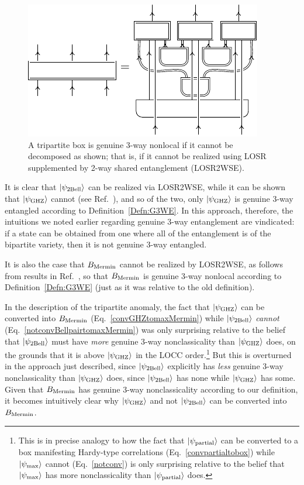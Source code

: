\documentclass[prx,11pt,letterpaper,twocolumn,accepted=2023-11-27]{quantumarticle}
\newcommand{\ket}[1]{\left| #1 \right>}
\theoremstyle{plain}
\theoremstyle{definition}
\begin{document}
\begin{figure}[htb!]
\centering
    \includegraphics[scale=1]{fig_non_locality.pdf}
    \caption{
           A tripartite box is genuine 3-way nonlocal if it cannot be decomposed as shown; that is, if it cannot be realized using LOSR supplemented by 2-way shared entanglement (LOSR2WSE).  }
    \label{non_locality}
\end{figure}


 It is clear that $\ket{\psi_{\rm 2Bell}}$ can be realized via LOSR2WSE,
  while it can be shown that $\ket{\psi_{\rm GHZ}}$ cannot (see  Ref.~\cite{navascues2020genuine}), and so of the two, only $\ket{\psi_{\rm GHZ}}$ is genuine 3-way entangled according to Definition~\ref{Defn:G3WE}.
   In this approach, therefore, the intuitions we noted earlier regarding genuine 3-way entanglement are vindicated: if a state can be obtained from one where all of the entanglement is of the bipartite variety, then it is not genuine 3-way entangled.  

 It is also the case that 
 $B_{\rm Mermin}$ cannot be realized by LOSR2WSE, as follows from results
 in Ref.~\cite{wolfe2021infl}, so that  $B_{\rm Mermin}$ is genuine 3-way nonlocal according to Definition~\ref{Defn:G3WE}
   (just as it was relative to the old definition).
 
In the description of the tripartite anomaly, the fact that $\ket{\psi_{\rm GHZ}}$ can be converted into $B_{\rm Mermin}$ (Eq.~\eqref{convGHZtomaxMermin})  while $\ket{\psi_{\rm 2Bell}}$ {\em cannot} (Eq.~\eqref{notconvBellpairtomaxMermin})
 was only surprising relative to the belief that $\ket{\psi_{\rm 2Bell}}$ must have {\em more} genuine 3-way nonclassicality than $\ket{\psi_{\rm GHZ}}$ does, on the grounds that it is above $\ket{\psi_{\rm GHZ}}$ in the LOCC order.\footnote{This is in precise analogy to how the fact that $\ket{\psi_{\rm partial}}$ can be converted to a box manifesting Hardy-type correlations (Eq.~\eqref{convpartialtobox}) while $\ket{\psi_{\rm max}}$ cannot (Eq.~\eqref{notconv}) is only surprising relative to the belief that $\ket{\psi_{\rm max}}$ has more nonclassicality than $\ket{\psi_{\rm partial}}$ does.} But this is overturned in the approach just described, since  $\ket{\psi_{\rm 2Bell}}$ explicitly has {\em less} genuine 3-way nonclassicality than $\ket{\psi_{\rm GHZ}}$ does, since $\ket{\psi_{\rm 2Bell}}$ has none while $\ket{\psi_{\rm GHZ}}$ has some.
 Given that $B_{\rm Mermin}$ has genuine 3-way nonclassicality according to our definition, it becomes intuitively clear why  $\ket{\psi_{\rm GHZ}}$ and not $\ket{\psi_{\rm 2Bell}}$ can be converted into $B_{\rm Mermin}$.
\end{document}
